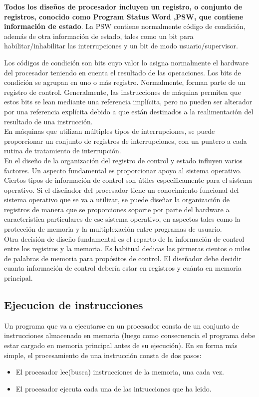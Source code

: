 \documentclass{article}
\begin{document}
			\textbf{Todos los diseños de procesador incluyen un registro, o conjunto de registros, conocido como Program Status Word ,PSW, que contiene información de estado}. La PSW contiene normalmente código de condición, además de otra información de estado, tales como un bit para habilitar/inhabilitar las interrupciones y un bit de modo usuario/supervisor.
			
			Los códigos de condición son bits cuyo valor lo asigna normalmente el hardware del procesador teniendo en cuenta el resultado de las operaciones. Los bits de condición se agrupan en uno o más registro. Normalmente, forman parte de un registro de control. Generalmente, las instrucciones de máquina permiten que estos bits se lean mediante una referencia implícita, pero no pueden ser alterador por una referencia explícita debido a que están destinados a la realimentación del resultado de una instrucción. \\
			
			En máquinas que utilizan múltiples tipos de interrupciones, se puede proporcionar un conjunto de registros de interrupciones, con un puntero a cada rutina de tratamiento de interrupción. \\
			
			En el diseño de la organización del registro de control y estado influyen varios factores. Un aspecto fundamental es proporcionar apoyo al sistema operativo. Ciertos tipos de información de control son útiles específicamente para el sistema operativo. Si el diseñador del procesador tiene un conocimiento funcional del sistema operativo que se va a utilizar, se puede diseñar la organización de registros de manera que se proporciones soporte por parte del hardware a característica particulares de ese sistema operativo, en aspectos tales como la protección de memoria y la multiplexación entre programas de usuario. \\
			
			Otra decisión de diseño fundamental es el reparto de la información de control entre los registros y la memoria. Es habitual dedicas las pirmeras cientos o miles de palabras de memoria para propósitos de control. El diseñador debe decidir cuanta información de control debería estar en registros y cuánta en memoria principal. \\
			
			\subsection{Ejecucion de instrucciones}
				Un programa que va a ejecutarse en un procesador consta de un conjunto de instrucciones almacenado en memoria (luego como consecuencia el programa debe estar cargado en memoria principal antes de su ejecución). En su forma más simple, el procesamiento de una instrucción consta de dos pasos: 
				\begin{itemize}
					\item El procesador lee(busca) instrucciones de la memoria, una cada vez.
					\item El procesador ejecuta cada una de las intrucciones que ha leido.
				\end{itemize}
				
\end{document}
